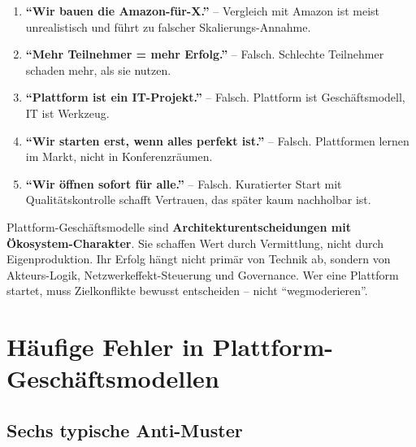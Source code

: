 \documentclass[11pt,a4paper,oneside]{article}
\newcommand{\fachbegriff}[1]{\textbf{#1}}
\begin{document}
\begin{enumerate}
  \item \fachbegriff{``Wir bauen die Amazon-für-X.''} -- Vergleich mit Amazon ist meist unrealistisch und führt zu falscher Skalierungs-Annahme.
  \item \fachbegriff{``Mehr Teilnehmer = mehr Erfolg.''} -- Falsch. Schlechte Teilnehmer schaden mehr, als sie nutzen.
  \item \fachbegriff{``Plattform ist ein IT-Projekt.''} -- Falsch. Plattform ist Geschäftsmodell, IT ist Werkzeug.
  \item \fachbegriff{``Wir starten erst, wenn alles perfekt ist.''} -- Falsch. Plattformen lernen im Markt, nicht in Konferenzräumen.
  \item \fachbegriff{``Wir öffnen sofort für alle.''} -- Falsch. Kuratierter Start mit Qualitätskontrolle schafft Vertrauen, das später kaum nachholbar ist.
\end{enumerate}

\begin{merkbox}
Plattform-Geschäftsmodelle sind \textbf{Architekturentscheidungen mit Ökosystem-Charakter}. Sie schaffen Wert durch Vermittlung, nicht durch Eigenproduktion. Ihr Erfolg hängt nicht primär von Technik ab, sondern von Akteurs-Logik, Netzwerkeffekt-Steuerung und Governance. Wer eine Plattform startet, muss Zielkonflikte bewusst entscheiden -- nicht ``wegmoderieren''.
\end{merkbox}

\section{Häufige Fehler in Plattform-Geschäftsmodellen}

\subsection{Sechs typische Anti-Muster}
\end{document}
